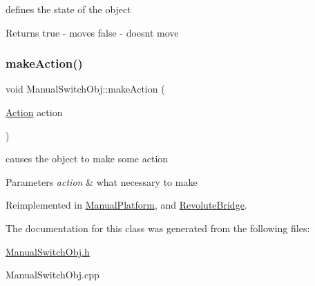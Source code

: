 defines the state of the object 

\begin{DoxyReturn}{Returns}
\textquotesingle{}true\textquotesingle{} -\/ moves \textquotesingle{}false\textquotesingle{} -\/ doesn\textquotesingle{}t move 
\end{DoxyReturn}
\mbox{\label{class_manual_switch_obj_a4d4a826fb8211a787f158b2973f843ae}} 
\subsubsection{\texorpdfstring{make\+Action()}{makeAction()}}
{\footnotesize\ttfamily void Manual\+Switch\+Obj\+::make\+Action (\begin{DoxyParamCaption}\item[{\hyperlink{_manual_switch_obj_8h_a8bb1ef53467e4f61410d12822d922498}{Action}}]{action }\end{DoxyParamCaption})\hspace{0.3cm}{\ttfamily [virtual]}}



causes the object to make some action 


\begin{DoxyParams}{Parameters}
{\em action} & what necessary to make \\
\hline
\end{DoxyParams}


Reimplemented in \hyperlink{class_manual_platform_ad7ae2aac108330a84246e3337fb5af81}{Manual\+Platform}, and \hyperlink{class_revolute_bridge_aad7a57a94ab4bd41cd4e1da48d627d00}{Revolute\+Bridge}.



The documentation for this class was generated from the following files\+:\begin{DoxyCompactItemize}
\item 
\hyperlink{_manual_switch_obj_8h}{Manual\+Switch\+Obj.\+h}\item 
Manual\+Switch\+Obj.\+cpp\end{DoxyCompactItemize}
